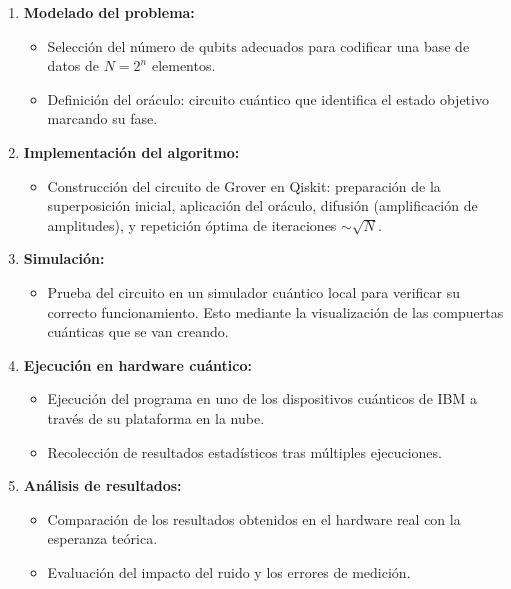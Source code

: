 \documentclass{article}
\begin{document}
\begin{enumerate}
    \item \textbf{Modelado del problema:}
    \begin{itemize}
        \item Selección del número de qubits adecuados para codificar una base de datos de $N = 2^n$ elementos.
        \item Definición del oráculo: circuito cuántico que identifica el estado objetivo marcando su fase.
    \end{itemize}
    
    \item \textbf{Implementación del algoritmo:}
    \begin{itemize}
        \item Construcción del circuito de Grover en Qiskit: preparación de la superposición inicial, aplicación del oráculo, difusión (amplificación de amplitudes), y repetición óptima de iteraciones $\sim \sqrt{N}$.
    \end{itemize}
    
    \item \textbf{Simulación:}
    \begin{itemize}
        \item Prueba del circuito en un simulador cuántico local para verificar su 
                correcto funcionamiento. Esto mediante la 
                visualización de las compuertas cuánticas que se van creando.
    \end{itemize}
    
    \item \textbf{Ejecución en hardware cuántico:}
    \begin{itemize}
        \item Ejecución del programa en uno de los dispositivos cuánticos de IBM a través de su plataforma en la nube.
        \item Recolección de resultados estadísticos tras múltiples ejecuciones.
    \end{itemize}
    
    \item \textbf{Análisis de resultados:}
    \begin{itemize}
        \item Comparación de los resultados obtenidos en el hardware real con
            la esperanza teórica.
        \item Evaluación del impacto del ruido y los errores de medición.
    \end{itemize}
\end{enumerate}
\end{document}

